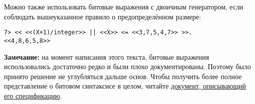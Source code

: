 Можно также использовать битовые выражения с двоичным генератором, если соблюдать вышеуказанное правило о предопределённом размере:
\begin{lstlisting}[style=repl]
7> << <<(X+1)/integer>> || <<X>> <= <<3,7,5,4,7>> >>.
<<4,8,6,5,8>>
\end{lstlisting}
\colorbox{lgray}
{
    \begin{minipage}{\linewidth}
        \textbf{Замечание:} на момент написания этого текста, битовые выражения использовались достаточно редко и были плохо документированы.
        Поэтому было принято решение не углубляться дальше основ.
        Чтобы получить более полное представление о битовом синтаксисе в целом, читайте \href{http://user.it.uu.se/~pergu/papers/erlang05.pdf}{документ, описывающий его спецификацию}.
    \end{minipage}
}
